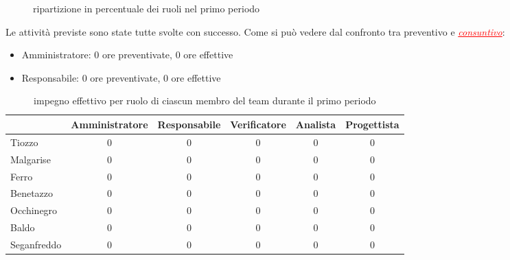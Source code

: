         \begin{figure*}
        \centering
        \caption{ripartizione in percentuale dei ruoli nel primo periodo}
        \label{fig:2}
        \end{figure*}

        \newpage

        Le attività previste sono state tutte svolte con successo. Come si può vedere dal confronto tra preventivo e \textcolor{red}{\uline{\textit{consuntivo}}}:
        \begin{itemize}
            \item Amministratore: 0 ore preventivate, 0 ore effettive
            \item Responsabile: 0 ore preventivate, 0 ore effettive
        \end{itemize}

        \begin{table}[!h]
            \centering
            \begin{tabular}{ l c c c c c } 
                \hline
                \textbf{} & \textbf{Amministratore} & \textbf{Responsabile} & \textbf{Verificatore} &\textbf{Analista} & \textbf{Progettista} \\
                \hline 
                Tiozzo      & 0 & 0 & 0 & 0 & 0 \\ 
                Malgarise   & 0 & 0 & 0 & 0 & 0 \\ 
                Ferro       & 0 & 0 & 0 & 0 & 0 \\ 
                Benetazzo   & 0 & 0 & 0 & 0 & 0 \\ 
                Occhinegro  & 0 & 0 & 0 & 0 & 0 \\ 
                Baldo       & 0 & 0 & 0 & 0 & 0 \\ 
                Seganfreddo & 0 & 0 & 0 & 0 & 0 \\
                \hline
            \end{tabular}
            \caption{impegno effettivo per ruolo di ciascun membro del team durante il primo periodo}
            \label{tab:2}
        \end{table}
        \newpage

